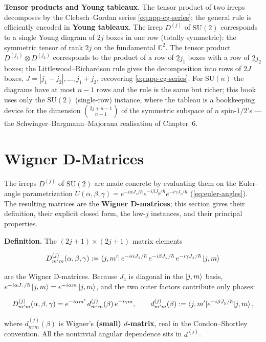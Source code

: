 \medskip\noindent\textbf{Tensor products and Young tableaux.} The tensor product of two irreps decomposes by the Clebsch--Gordan series \eqref{eq:app-cg-series}; the general rule is efficiently encoded in \textbf{Young tableaux}. The irrep $D^{(j)}$ of $\mathrm{SU}(2)$ corresponds to a single Young diagram of $2j$ boxes in one row (totally symmetric): the symmetric tensor of rank $2j$ on the fundamental $\mathbb C^{2}$. The tensor product $D^{(j_{1})}\otimes D^{(j_{2})}$ corresponds to the product of a row of $2j_{1}$ boxes with a row of $2j_{2}$ boxes; the Littlewood--Richardson rule gives the decomposition into rows of $2J$ boxes, $J=|j_{1}-j_{2}|,\ldots,j_{1}+j_{2}$, recovering \eqref{eq:app-cg-series}. For $\mathrm{SU}(n)$ the diagrams have at most $n-1$ rows and the rule is the same but richer; this book uses only the $\mathrm{SU}(2)$ (single-row) instance, where the tableau is a bookkeeping device for the dimension $\binom{2j+n-1}{n-1}$ of the symmetric subspace of $n$ spin-$1/2$'s --- the Schwinger--Bargmann--Majorana realisation of Chapter~6.

\section{Wigner D-Matrices}
\label{sec:appendix-d-matrices}

The irreps $D^{(j)}$ of $\mathrm{SU}(2)$ are made concrete by evaluating them on the Euler-angle parametrization $U(\alpha,\beta,\gamma)=e^{-i\alpha J_{z}/\hbar}e^{-i\beta J_{y}/\hbar}e^{-i\gamma J_{z}/\hbar}$ (\eqref{eq:euler-angles}). The resulting matrices are the \textbf{Wigner D-matrices}; this section gives their definition, their explicit closed form, the low-$j$ instances, and their principal properties.

\medskip\noindent\textbf{Definition.} The $(2j+1)\times(2j+1)$ matrix elements
\begin{linenomath}
\begin{equation}
D^{(j)}_{m'm}(\alpha,\beta,\gamma):=\braket{j,m'|\,e^{-i\alpha J_{z}/\hbar}\,e^{-i\beta J_{y}/\hbar}\,e^{-i\gamma J_{z}/\hbar}\,|j,m}
\label{eq:D-matrix-def-app}
\end{equation}
\end{linenomath}
are the Wigner D-matrices. Because $J_{z}$ is diagonal in the $\ket{j,m}$ basis, $e^{-i\alpha J_{z}/\hbar}\ket{j,m}=e^{-i\alpha m}\ket{j,m}$, and the two outer factors contribute only phases:
\begin{linenomath}
\begin{equation}
D^{(j)}_{m'm}(\alpha,\beta,\gamma)=e^{-i\alpha m'}\,d^{(j)}_{m'm}(\beta)\,e^{-i\gamma m},
\qquad
d^{(j)}_{m'm}(\beta):=\braket{j,m'|e^{-i\beta J_{y}/\hbar}|j,m},
\label{eq:small-d}
\end{equation}
\end{linenomath}
where $d^{(j)}_{m'm}(\beta)$ is Wigner's \textbf{(small) $d$-matrix}, real in the Condon--Shortley convention. All the nontrivial angular dependence sits in $d^{(j)}$.

